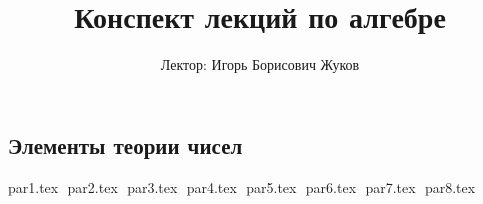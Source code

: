 \documentclass[12pt, letterpaper]{report}
\title{Конспект лекций по алгебре}
\author{Лектор: Игорь Борисович Жуков}
\date{}
\theoremstyle{definition}
\begin{document}
\maketitle

\newpage
\pagestyle{plain}

\tableofcontents

\newpage
\begin{normalsize}

\chapter*{Элементы теории чисел}

{par1.tex}
$ $
{par2.tex}
$ $
{par3.tex}
$ $
{par4.tex}
$ $
{par5.tex}
$ $
{par6.tex}
$ $
{par7.tex}
$ $
{par8.tex}
$ $

\end{normalsize}
\end{document}
